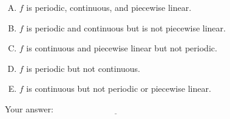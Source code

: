 \documentclass[10pt]{amsart}
\begin{document}
\begin{enumerate}
  \begin{enumerate}[(A)]
  \item $f$ is periodic, continuous, and piecewise linear.
  \item $f$ is periodic and continuous but is not piecewise linear.
  \item $f$ is continuous and piecewise linear but not periodic.
  \item $f$ is periodic but not continuous.
  \item $f$ is continuous but not periodic or piecewise linear.
  \end{enumerate}

  \vspace{0.1in}
  Your answer: $\underline{\qquad\qquad\qquad\qquad\qquad\qquad\qquad}$
  \vspace{0.4in}

\end{enumerate}
\end{document}
